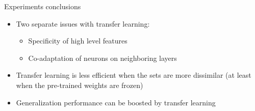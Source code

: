 \documentclass[xcolor=pdftex,dvipsnames,table,mathserif]{beamer}
\begin{document}
\begin{frame}{Experiments conclusions}

\begin{itemize}
\item Two separate issues with transfer learning:
  \begin{itemize}
  \item Specificity of high level features
  \item Co-adaptation of neurons on neighboring layers
  \end{itemize}
\item Transfer learning is less efficient when the sets are more dissimilar (at least when the pre-trained weights are frozen)
\item Generalization performance can be boosted by transfer learning
\end{itemize}

\end{frame}












\end{document}
